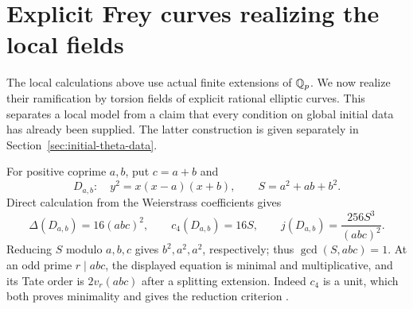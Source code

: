 \section{Explicit Frey curves realizing the local fields}
\label{sec:frey-realizations}

The local calculations above use actual finite extensions of $\mathbb Q_p$.
We now realize their ramification by torsion fields of explicit rational
elliptic curves. This separates a local model from a claim that every
condition on global initial data has already been supplied. The latter
construction is given separately in Section~\ref{sec:initial-theta-data}.

For positive coprime $a,b$, put $c=a+b$ and
\[
 D_{a,b}:\quad y^2=x(x-a)(x+b),\qquad S=a^2+ab+b^2.
\]
Direct calculation from the Weierstrass coefficients gives
\begin{equation}\label{eq:fr-invariants}
 \Delta(D_{a,b})=16(abc)^2,\qquad c_4(D_{a,b})=16S,
 \qquad j(D_{a,b})=\frac{256S^3}{(abc)^2}.
\end{equation}
Reducing $S$ modulo $a,b,c$ gives $b^2,a^2,a^2$, respectively;
thus $\gcd(S,abc)=1$. At an odd prime $r\mid abc$, the displayed
equation is minimal and multiplicative, and its Tate order is
$2v_r(abc)$ after a splitting extension. Indeed $c_4$ is a unit,
which both proves minimality and gives the reduction criterion
\cite[VII.5.1]{Silverman}.

